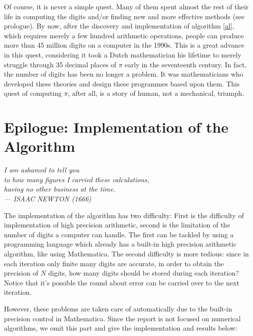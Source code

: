 \documentclass{report}
\begin{document}
\begin{titlepage}
Of course, it is never a simple quest. Many of them spent almost the rest of their life in computing the digits and/or finding new and more effective methods (see prologue). By now, after the discovery  and implementation of algorithm \ref{al}, which requires merely a few hundred arithmetic operations, people can produce more than 45 million digits on a computer in the 1990s. This is a great advance in this quest, considering it took a Dutch mathematician his lifetime to merely struggle through 35 decimal places of $\pi$ early in the seventeenth century\cite{Knuth:1997aa}. In fact, the number of digits has been no longer a problem. It was mathematicians who developed these theories and design these programmes based upon them. This quest of computing $\pi$, after all, is a story of human, not a mechanical, triumph\cite{Dunham:1990aa}.

\eject






\chapter{Epilogue: Implementation of the Algorithm}
{\flushright
	{\sffamily\slshape
		I am ashamed to tell you\\ 
		to how many figures I carried these calculations,\\ 
		having no other business at the time.\smallskip\\
		{\sffamily\upshape --- ISAAC NEWTON (1666)}
	}	

}


\vskip 1in
The implementation of the algorithm has two difficulty: First is the difficulty
of implementation of high precision arithmetic, second is the limitation of the
number of digits a computer can handle. The first can be tackled by using a
programming language which already has a built-in high precision arithmetic
algorithm, like using Mathematica\texttrademark. The second difficulty is more
tedious: since in each iteration only finite many digits are accurate, in order
to obtain the precision of $N$ digits, how many digits should be stored during
each iteration? Notice that it's possible the round about error can be carried
over to the next iteration.

However, these problems are taken care of automatically due to the built-in
precision control in Mathematica\texttrademark. Since the report is not focused
on numerical algorithms, we omit this part and give the implementation and
results below:


\end{titlepage}
\end{document}
